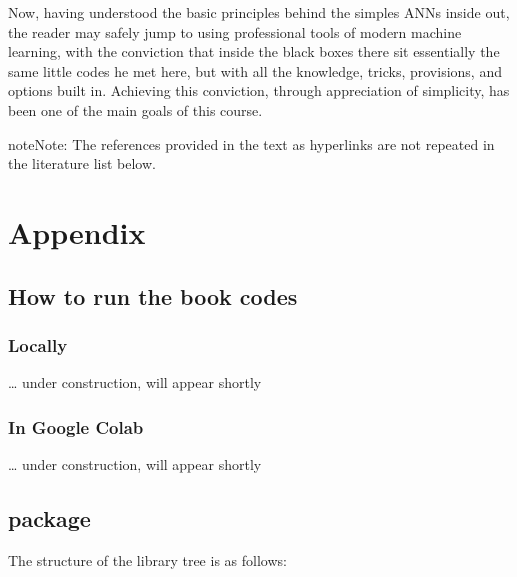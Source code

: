 \documentclass[letterpaper,10pt,english]{jupyterBook}
\begin{document}
\sphinxAtStartPar
Now, having understood the basic principles behind the simples ANNs inside out, the reader may safely jump to using professional tools of modern machine learning, with the conviction that inside the black boxes there sit essentially the same little codes he met here, but with all the knowledge, tricks, provisions, and options built in. Achieving this conviction, through appreciation of simplicity, has been one of the main goals of this course.

\begin{sphinxadmonition}{note}{Note:}
\sphinxAtStartPar
The references provided in the text as hyperlinks are not repeated in the literature list below.
\end{sphinxadmonition}

\sphinxAtStartPar



\chapter{Appendix}
\label{\detokenize{docs/appendix:appendix}}\label{\detokenize{docs/appendix::doc}}

\section{How to run the book codes}
\label{\detokenize{docs/appendix:how-to-run-the-book-codes}}\label{\detokenize{docs/appendix:app-run}}

\subsection{Locally}
\label{\detokenize{docs/appendix:locally}}
\sphinxAtStartPar
… under construction, will appear shortly


\subsection{In Google Colab}
\label{\detokenize{docs/appendix:in-google-colab}}
\sphinxAtStartPar
… under construction, will appear shortly


\section{ package}
\label{\detokenize{docs/appendix:neural-package}}\label{\detokenize{docs/appendix:app-lab}}
\sphinxAtStartPar
The structure of the library tree is as follows:
\end{document}
